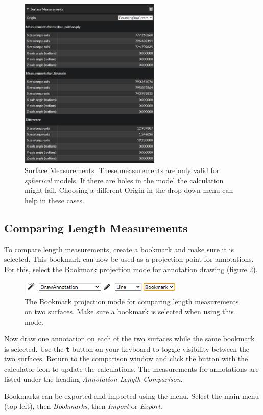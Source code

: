\begin{figure}[h]
	\centering
	\includegraphics[width=0.6\textwidth]{pics/surfaceComparisonSurfaceMeasurements.PNG}
	\caption[The surface measurements interface.]{Surface Measurements. These measurements are only valid for \emph{spherical} models. If there are holes in the model the calculation might fail. Choosing a different Origin in the drop down menu can help in these cases.}
	\label{surfaceComparisonSurfaceMeasurements.PNG}
\end{figure}

\clearpage
\subsection{Comparing Length Measurements}

To compare length measurements, create a bookmark and make sure it is selected. This bookmark can now be used as a projection point for annotations. For this, select the Bookmark projection mode for annotation drawing (figure \ref{fig:surfaceComparisonBookmarkMode}).

\begin{figure}[h]
	\centering
	\includegraphics[width=0.7\textwidth]{pics/surfaceComparisonBookmarkMode.PNG}
	\caption[The Bookmark Projection Mode.]{The Bookmark projection mode for comparing length measurements on two surfaces. Make sure a bookmark is selected when using this mode.}
	\label{fig:surfaceComparisonBookmarkMode}
\end{figure}

Now draw one annotation on each of the two surfaces while the same bookmark is selected. Use the \texttt{t} button on your keyboard to toggle visibility between the two surfaces. Return to the comparison window and click the button with the calculator icon to update the calculations. The measurements for annotations are listed under the heading \emph{Annotation Length Comparison}.

Bookmarks can be exported and imported using the menu. Select the main menu (top left), then \emph{Bookmarks}, then \emph{Import} or \emph{Export}.